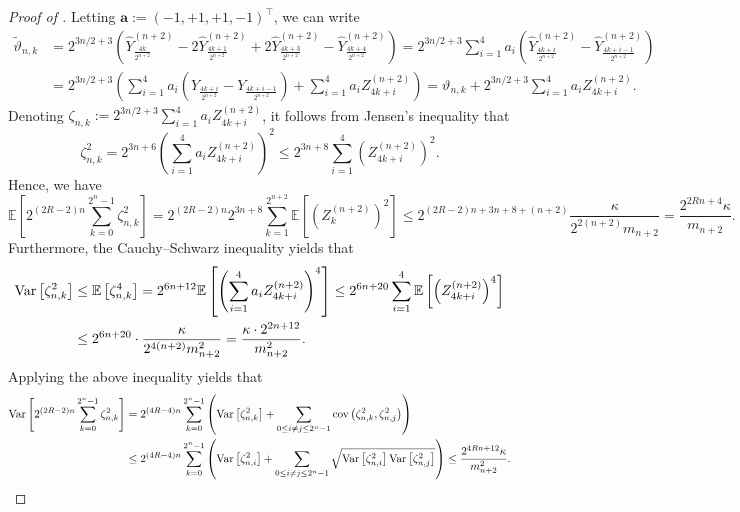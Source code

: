 \documentclass[12pt,reqno]{article}
\def\wh{\widehat}
\def\wt{\widetilde}
\numberwithin{equation}{section}
\def\cov{\mbox{cov}}
\def\var{\mbox{var}}
\theoremstyle{definition}
\def\wt#1{\widetilde{#1}}
\def\wh{\widehat}
\def\wt{\widetilde}
\def\cov{\hbox{\rm cov}}\def\var{\text{\rm Var}}
\newcommand{\bE}{\mathbb{E}}
\begin{document}
\begin{proof}[Proof of ]
	Letting $\bm a := (-1,+1,+1,-1)^\top$, we can write	\begin{equation*}
		\begin{split}
			\wt \vartheta_{n,k} &= 2^{3n/2+3}\left(\wh Y^{(n+2)}_{\frac{4k}{2^{n+2}}} - 2\wh Y^{(n+2)}_{\frac{4k+1}{2^{n+2}}} + 2\wh Y^{(n+2)}_{\frac{4k+3}{2^{n+2}}} - \wh Y^{(n+2)}_{\frac{4k+4}{2^{n+2}}}\right)= 2^{3n/2+3} \sum_{i = 1}^{4} a_i \left(\wh Y^{(n+2)}_{\frac{4k+i}{2^{n+2}}}-\wh Y^{(n+2)}_{\frac{4k+i-1}{2^{n+2}}}\right)\\& = 2^{3n/2+3}\left( \sum_{i = 1}^{4} a_i \left( Y_{\frac{4k+i}{2^{n+2}}}- Y_{\frac{4k+i-1}{2^{n+2}}}\right) + \sum_{i = 1}^{4} a_i Z^{(n+2)}_{4k+i}\right) = \vartheta_{n,k} + 2^{3n/2+3}\sum_{i = 1}^{4} a_i Z^{(n+2)}_{4k+i}.
		\end{split}
	\end{equation*}
	Denoting $\zeta_{n,k} := 2^{3n/2+3}\sum_{i = 1}^{4} a_i Z^{(n+2)}_{4k+i}$,  it follows from Jensen's inequality that 
	\begin{equation*}
		\zeta_{n,k}^2 = 2^{3n + 6}\left(\sum_{i = 1}^{4} a_i Z^{(n+2)}_{4k+i}\right)^2 \le 2^{3n+8}\sum_{i = 1}^{4}\left(Z^{(n+2)}_{4k+i}\right)^2.
	\end{equation*}
	Hence, we have 
	\begin{equation*}
		\bE\left[2^{(2R-2)n}\sum_{k = 0}^{2^n-1}\zeta_{n,k}^2\right] = 2^{(2R-2)n} 2^{3n+8}\sum_{k = 1}^{2^{n+2}}\bE\left[\left(Z^{(n+2)}_{k}\right)^2\right] \le 2^{(2R-2)n + 3n+8 +(n+2)}\frac{\kappa}{2^{2(n+2)}m_{n+2}} = \frac{2^{2Rn+4}\kappa}{m_{n+2}}.
	\end{equation*}
	Furthermore, the Cauchy--Schwarz inequality yields that 
	\begin{equation*}
		\begin{split}
			\var\left[\zeta_{n,k}^2\right] &\le \bE\left[\zeta^4_{n,k}\right] = 2^{6n+12}\bE\left[\left(\sum_{i = 1}^{4}a_iZ^{(n+2)}_{4k+i}\right)^4\right] \le 2^{6n+20} \sum_{i = 1}^{4}\bE\left[\left(Z^{(n+2)}_{4k+i}\right)^4\right]\\& \le 2^{6n + 20}\cdot \frac{\kappa}{2^{4(n+2)}m_{n+2}^2} = \frac{\kappa \cdot 2^{2n+12}}{m_{n+2}^2}.
		\end{split}
	\end{equation*}
	Applying the above inequality yields that 
	\begin{equation*}
		\begin{split}
			\var\left[2^{(2R-2)n}\sum_{k = 0}^{2^n-1}\zeta_{n,k}^2\right] &= 2^{(4R -4)n}\sum_{k = 0}^{2^{n}-1}\left(\var\left[\zeta_{n,k}^2\right] + \sum_{0 \le i \neq j \le 2^{n}-1} \cov\left(\zeta_{n,k}^2,\zeta_{n,j}^2\right)\right)\\&\le 2^{(4R - 4)n}\sum_{k = 0}^{2^{n}-1}\left(\var\left[\zeta_{n,i}^2\right] + \sum_{0 \le i \neq j \le 2^{n}-1} \sqrt{\var\left[\zeta_{n,i}^2\right]\var\left[\zeta_{n,j}^2\right]}\right) \le \frac{2^{4Rn+12}\kappa}{m^2_{n+2}}.

\end{split}
\end{equation*}
\end{proof}
\end{document}
